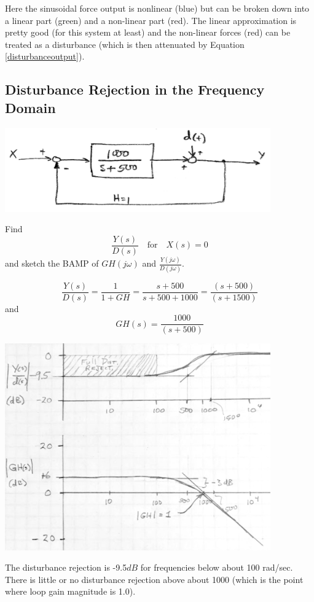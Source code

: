 \begin{Example}
Here the sinusoidal force output is nonlinear (blue) but can be broken down into a linear part (green) and a non-linear part (red). The linear approximation is pretty good (for this system at least) and the non-linear forces (red) can be treated as a disturbance (which is then attenuated by Equation \ref{disturbanceoutput}).

\end{Example}


\subsection{Disturbance Rejection in the Frequency Domain}


\begin{ExampleSmall}

\includegraphics[width=4.5in]{figs06/00774a.png}

Find
\[
\frac{Y(s)}{D(s)} \quad \mathrm{for} \quad  X(s) = 0
\]
and sketch the BAMP of $GH(j\omega)$ and $\frac{Y(j\omega)}{D(j\omega)}$.

\vspace{0.25in}

\[
\frac{Y(s)}{D(s)} = \frac{1}{1+GH} =  \frac  {s+500}  {s+500 + 1000} = \frac{(s+500)}{(s+1500)}
\]
and
\[
GH(s) = \frac{1000}{(s+500)}
\]


\includegraphics[width=4.5in]{figs06/G64M22.png}


The disturbance rejection is -9.5$dB$ for frequencies below about 100 rad/sec.   There is
little or no disturbance rejection above about 1000 (which is the point where loop gain
magnitude is 1.0).

\end{ExampleSmall}

